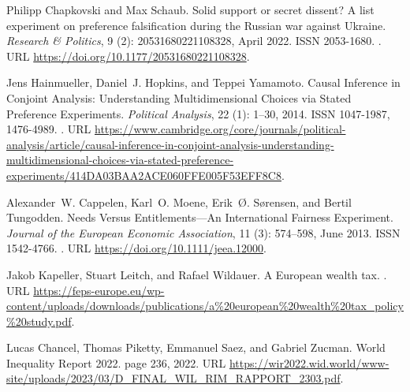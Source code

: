 \documentclass[12pt,english]{article}
\begin{document}
\begin{thebibliography}{55}
  Philipp Chapkovski and Max Schaub.
  \newblock Solid support or secret dissent? {{A}} list experiment on preference
    falsification during the {{Russian}} war against {{Ukraine}}.
  \newblock \emph{Research \& Politics}, 9 (2):
    20531680221108328, April 2022.
  \newblock ISSN 2053-1680.
  \newblock {}.
  \newblock URL \url{https://doi.org/10.1177/20531680221108328}.
  
  Jens Hainmueller, Daniel~J. Hopkins, and Teppei Yamamoto.
  \newblock Causal {{Inference}} in {{Conjoint Analysis}}: {{Understanding
    Multidimensional Choices}} via {{Stated Preference Experiments}}.
  \newblock \emph{Political Analysis}, 22 (1): 1--30, 2014.
  \newblock ISSN 1047-1987, 1476-4989.
  \newblock {}.
  \newblock URL
    \url{https://www.cambridge.org/core/journals/political-analysis/article/causal-inference-in-conjoint-analysis-understanding-multidimensional-choices-via-stated-preference-experiments/414DA03BAA2ACE060FFE005F53EFF8C8}.
  
  Alexander~W. Cappelen, Karl~O. Moene, Erik~{\O}. S{\o}rensen, and Bertil
    Tungodden.
  \newblock Needs {{Versus Entitlements}}---{{An International Fairness
    Experiment}}.
  \newblock \emph{Journal of the European Economic Association}, 11
    (3): 574--598, June 2013.
  \newblock ISSN 1542-4766.
  \newblock {}.
  \newblock URL \url{https://doi.org/10.1111/jeea.12000}.
  
  Jakob Kapeller, Stuart Leitch, and Rafael Wildauer.
  \newblock A {{European}} wealth tax.
  .
  \newblock URL
    \url{https://feps-europe.eu/wp-content/uploads/downloads/publications/a\%20european\%20wealth\%20tax\_policy\%20study.pdf}.
  
  Lucas Chancel, Thomas Piketty, Emmanuel Saez, and Gabriel Zucman.
  \newblock World {{Inequality Report}} 2022.
  \newblock page 236, 2022.
  \newblock URL
    \url{https://wir2022.wid.world/www-site/uploads/2023/03/D\_FINAL\_WIL\_RIM\_RAPPORT\_2303.pdf}.
  

\end{thebibliography}
\end{document}
